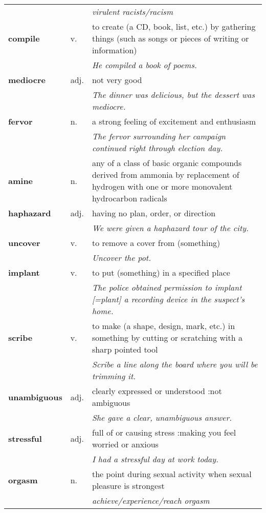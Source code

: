 \documentclass[a4paper]{article}
\begin{document}
\begin{longtable}{llp{11cm}}
 & & \textit{virulent racists/racism}\\[0.08cm]
\textbf{compile} & v. &  to create (a CD, book, list, etc.) by gathering things (such as songs or pieces of writing or information) \\
 & & \textit{He compiled a book of poems.}\\[0.08cm]
\textbf{mediocre} & adj. &  not very good \\
 & & \textit{The dinner was delicious, but the dessert was mediocre.}\\[0.08cm]
\textbf{fervor} & n. &  a strong feeling of excitement and enthusiasm \\
 & & \textit{The fervor surrounding her campaign continued right through election day.}\\[0.08cm]
\textbf{amine} & n. &  any of a class of basic organic compounds derived from ammonia by replacement of hydrogen with one or more monovalent hydrocarbon radicals \\[0.08cm]
\textbf{haphazard} & adj. &  having no plan, order, or direction \\
 & & \textit{We were given a haphazard tour of the city.}\\[0.08cm]
\textbf{uncover} & v. &  to remove a cover from (something) \\
 & & \textit{Uncover the pot.}\\[0.08cm]
\textbf{implant} & v. &  to put (something) in a specified place \\
 & & \textit{The police obtained permission to implant [=plant] a recording device in the suspect's home.}\\[0.08cm]
\textbf{scribe} & v. &  to make (a shape, design, mark, etc.) in something by cutting or scratching with a sharp pointed tool \\
 & & \textit{Scribe a line along the board where you will be trimming it.}\\[0.08cm]
\textbf{unambiguous} & adj. &  clearly expressed or understood :not ambiguous \\
 & & \textit{She gave a clear, unambiguous answer.}\\[0.08cm]
\textbf{stressful} & adj. &  full of or causing stress :making you feel worried or anxious \\
 & & \textit{I had a stressful day at work today.}\\[0.08cm]
\textbf{orgasm} & n. &  the point during sexual activity when sexual pleasure is strongest \\
 & & \textit{achieve/experience/reach orgasm}\\[0.08cm]

\end{longtable}
\end{document}
